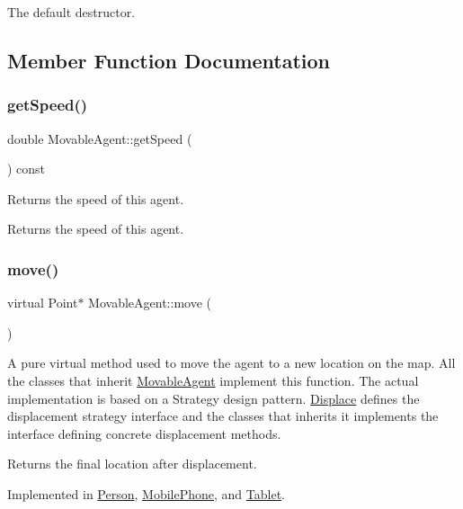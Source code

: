 The default destructor. 

\subsection{Member Function Documentation}
\mbox{\label{class_movable_agent_a12fcdaee60f5bb29f15fe113a7dacaac}} 
\subsubsection{\texorpdfstring{get\+Speed()}{getSpeed()}}
{\footnotesize\ttfamily double Movable\+Agent\+::get\+Speed (\begin{DoxyParamCaption}{ }\end{DoxyParamCaption}) const}

Returns the speed of this agent. \begin{DoxyReturn}{Returns}
the speed of this agent. 
\end{DoxyReturn}
\mbox{\label{class_movable_agent_a88b617f0e78c817634e5b587da045ab0}} 
\subsubsection{\texorpdfstring{move()}{move()}}
{\footnotesize\ttfamily virtual Point$\ast$ Movable\+Agent\+::move (\begin{DoxyParamCaption}{ }\end{DoxyParamCaption})\hspace{0.3cm}{\ttfamily [pure virtual]}}

A pure virtual method used to move the agent to a new location on the map. All the classes that inherit \hyperlink{class_movable_agent}{Movable\+Agent} implement this function. The actual implementation is based on a Strategy design pattern. \hyperlink{class_displace}{Displace} defines the displacement strategy interface and the classes that inherits it implements the interface defining concrete displacement methods. \begin{DoxyReturn}{Returns}
the final location after displacement. 
\end{DoxyReturn}


Implemented in \hyperlink{class_person_a922e0462a1e7eac6523a9a864ce27afc}{Person}, \hyperlink{class_mobile_phone_a785d0cac08252386603c702ad8f38c5b}{Mobile\+Phone}, and \hyperlink{class_tablet_ab1b8c7591be0c6ea118c8ab1c17839bb}{Tablet}.

